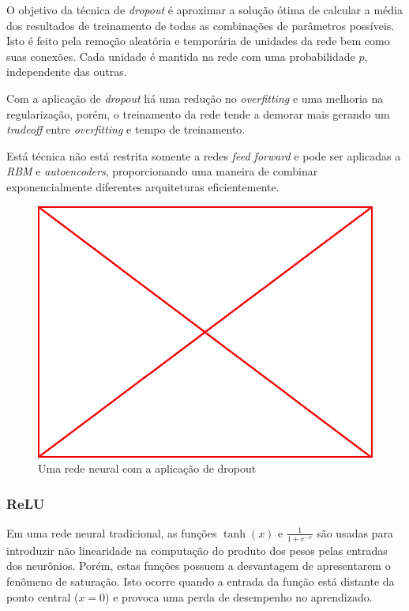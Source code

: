 O objetivo da técnica de \emph{dropout} é aproximar a solução ótima de calcular
a média dos resultados de treinamento de todas as combinações de parâmetros
possíveis. Isto é feito pela remoção aleatória e temporária de unidades da rede
bem como suas conexões. Cada unidade é mantida na rede com uma probabilidade
$p$, independente das outras.\cite{srivastava2014dropout}

Com a aplicação de \emph{dropout} há uma redução no \emph{overfitting} e uma
melhoria na regularização, porém, o treinamento da rede tende a demorar mais
gerando um \emph{tradeoff} entre \emph{overfitting} e tempo de
treinamento.\cite{srivastava2014dropout}

Está técnica não está restrita somente a redes \emph{feed forward} e pode ser
aplicadas a \emph{RBM} e \emph{autoencoders}, proporcionando uma maneira de
combinar exponencialmente diferentes arquiteturas
eficientemente.\cite{srivastava2014dropout}

\begin{figure}
  \caption{Uma rede neural com a aplicação de dropout}
  \begin{center}
    \includegraphics[scale=0.5]{placeholder}
  \end{center}
\end{figure}


\subsubsection{ReLU}

Em uma rede neural tradicional, as funções $\tanh(x)$ e $\frac{1}{1+e^{-x}}$ são
usadas para introduzir não linearidade na computação do produto dos pesos pelas
entradas dos neurônios. Porém, estas funções possuem a desvantagem de
apresentarem o fenômeno de saturação. Isto ocorre quando a entrada da função
está distante da ponto central ($x=0$) e provoca uma perda de desempenho no
aprendizado.\cite{krizhevsky2012imagenet}

